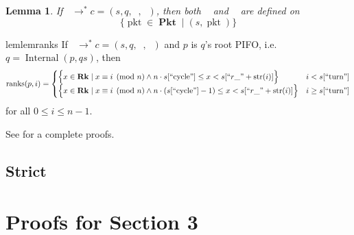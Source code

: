 \documentclass{amsart}
\DeclareMathOperator{\pkt}{\mathrm{pkt}}
\DeclareMathOperator{\Pkt}{\mathbf{Pkt}}
\DeclareMathOperator{\Rk}{\mathbf{Rk}}
\DeclareMathOperator{\Internal}{\mathrm{Internal}}
\DeclareMathOperator{\zprepush}{z_{\mathrm{pre-push}}}
\DeclareMathOperator{\zpostpop}{z_{\mathrm{post-pop}}}
\DeclareMathOperator{\crr}{c_{\text{RR}}}
\DeclareMathOperator{\ranks}{\mathrm{ranks}}
\newtheorem{lem}[thm]{Lemma}
\theoremstyle{definition}
\begin{document}
\begin{lem}
    If $\crr \to^\ast c = (s, q, \zprepush, \zpostpop)$, then 
    both $\zprepush$ and $\zpostpop$ are defined on $$\{\pkt \in \Pkt \mid (s, \pkt)\}$$
\end{lem}

\begin{restatable}{lem}{lemranks}
    \label{lem:ranks}
    If $\crr \to^\ast c = (s, q, \zprepush, \zpostpop)$ and $p$ is $q$'s root PIFO, i.e. $q = \Internal(p, qs)$, then
    $$
        \ranks(p, i) =
        \begin{cases}
            \Big\{x \in \Rk \mid x \equiv i \pmod n \land n \cdot s[``\text{cycle}"] \leq x < s[``r\_" + \mathrm{str}(i)] \Big\} 
            & i < s[``\text{turn}"]\\
            \Big\{x \in \Rk \mid x \equiv i \pmod n \land n \cdot (s[``\text{cycle}"] - 1) \leq x < s[``r\_" + \mathrm{str}(i)]\Big\} 
            & i \geq s[``\text{turn}"]
        \end{cases}
    $$
    for all $0 \leq i \leq n - 1$.
\end{restatable}

See  for a complete proofs.

\newpage

\subsection{Strict}

\newpage

\renewcommand\refname{\LARGE References}



\newpage

\appendix

\section{Proofs for Section 3} \label{sec:details}

\lemranks*
\end{document}
